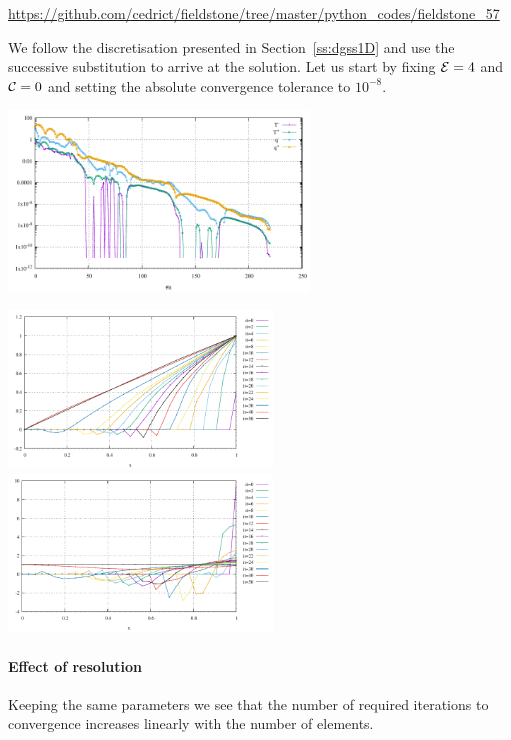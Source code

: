 

\url{https://github.com/cedrict/fieldstone/tree/master/python_codes/fieldstone_57}

We follow the discretisation presented in Section~\ref{ss:dgss1D} and use the 
successive substitution to arrive at the solution. 
Let us start by fixing ${\cal E}=4$ and ${\cal C}=0$ and setting the absolute convergence 
tolerance to $10^{-8}$.

\begin{center}
\includegraphics[width=8cm]{python_codes/fieldstone_57/results/E04_C000/convergence.pdf}
\end{center}

\begin{center}
\includegraphics[width=7cm]{python_codes/fieldstone_57/results/E04_C000/T_minus_evol.pdf}
\includegraphics[width=7cm]{python_codes/fieldstone_57/results/E04_C000/q_minus_evol.pdf}
\end{center}

\paragraph{Effect of resolution} Keeping the same parameters we see that the 
number of required iterations to convergence increases linearly with the number of elements.

